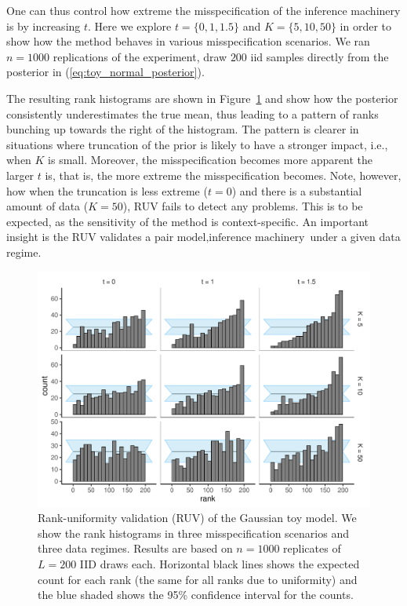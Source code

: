 \documentclass[oneside]{article}
\begin{document}
One can thus control how extreme the misspecification of the inference machinery is by increasing $t$.
Here we explore $t =  \{0, 1, 1.5\}$ and $K = \{5, 10 , 50\}$ in order to show how the method behaves in various misspecification scenarios.
We ran $n=1000$ replications of the experiment, draw $200$ iid samples directly from the posterior in (\ref{eq:toy_normal_posterior}).

The resulting rank histograms are shown in Figure~\ref{fig:ruv_normal_toy} and show how the posterior consistently underestimates the true mean, thus leading to a pattern of ranks bunching up towards the right of the histogram.
The pattern is clearer in situations where truncation of the prior is likely to have a stronger impact, i.e., when $K$ is small.
Moreover, the misspecification becomes more apparent the larger $t$ is, that is, the more extreme the misspecification becomes.
Note, however, how when the truncation is less extreme ($t = 0$) and there is a substantial amount of data ($K = 50$), RUV fails to detect any problems.
This is to be expected, as the sensitivity of the method is context-specific.
An important insight is the RUV validates a pair ${\text{model}, \text{inference machinery}}$ under a given data regime.
 

\begin{figure}[!ht]
   \includegraphics[width=\linewidth]{../figures/sbc_normal.pdf}
  \caption{Rank-uniformity validation (RUV) of the Gaussian toy model.
  We show the rank histograms in three misspecification scenarios and three data regimes.
  Results are based on $n=1000$ replicates of $L= 200$ IID draws each.
  Horizontal black lines shows the expected count for each rank (the same for all ranks due to uniformity) and the blue shaded  shows the 95\% confidence interval for the counts.
    }
  \label{fig:ruv_normal_toy}
\end{figure}
\end{document}
